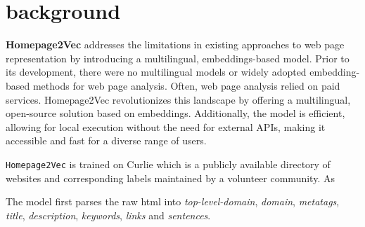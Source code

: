 \section{background}\label{sec:background}
\textbf{Homepage2Vec} addresses the limitations in existing approaches to web page representation by introducing a multilingual, embeddings-based model. Prior to its development, there were no multilingual models or widely adopted embedding-based methods for web page analysis. Often, web page analysis relied on paid services. Homepage2Vec revolutionizes this landscape by offering a multilingual, open-source solution based on embeddings. Additionally, the model is efficient, allowing for local execution without the need for external APIs, making it accessible and fast for a diverse range of users.

\texttt{Homepage2Vec} is trained on Curlie which is a publicly available directory of websites and corresponding labels maintained by a volunteer community. As 


The model first parses the raw html into \textit{top-level-domain}, \textit{domain}, \textit{metatags}, \textit{title}, \textit{description}, \textit{keywords}, \textit{links} and \textit{sentences}.

